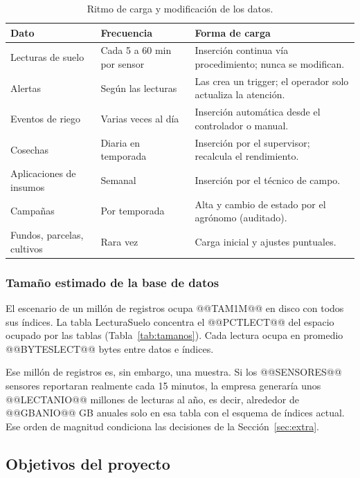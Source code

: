 \documentclass[11pt,letterpaper]{article}
\newcommand{\tbus}{\textunderscore\allowbreak}
\newcommand{\tb}[1]{{\ttfamily\let\_\tbus #1}}
\begin{document}
\begin{table}[H]
\centering\small
\begin{tabularx}{\textwidth}{>{\raggedright\arraybackslash}p{3.3cm}>{\raggedright\arraybackslash}p{3.2cm}X}
\toprule
\textbf{Dato} & \textbf{Frecuencia} & \textbf{Forma de carga} \\
\midrule
Lecturas de suelo & Cada 5 a 60 min por sensor & Inserción continua vía procedimiento; nunca se modifican. \\
Alertas & Según las lecturas & Las crea un trigger; el operador solo actualiza la atención. \\
Eventos de riego & Varias veces al día & Inserción automática desde el controlador o manual. \\
Cosechas & Diaria en temporada & Inserción por el supervisor; recalcula el rendimiento. \\
Aplicaciones de insumos & Semanal & Inserción por el técnico de campo. \\
Campañas & Por temporada & Alta y cambio de estado por el agrónomo (auditado). \\
Fundos, parcelas, cultivos & Rara vez & Carga inicial y ajustes puntuales. \\
\bottomrule
\end{tabularx}
\caption{Ritmo de carga y modificación de los datos.}
\label{tab:ritmos}
\end{table}

\subsubsection{Tamaño estimado de la base de datos}

El escenario de un millón de registros ocupa @@TAM1M@@ en disco con todos sus índices. La tabla \tb{Lectura\_Suelo} concentra el @@PCTLECT@@ del espacio ocupado por las tablas (Tabla~\ref{tab:tamanos}). Cada lectura ocupa en promedio @@BYTESLECT@@ bytes entre datos e índices.


Ese millón de registros es, sin embargo, una muestra. Si los @@SENSORES@@ sensores reportaran realmente cada 15 minutos, la empresa generaría unos @@LECTANIO@@ millones de lecturas al año, es decir, alrededor de @@GBANIO@@ GB anuales solo en esa tabla con el esquema de índices actual. Ese orden de magnitud condiciona las decisiones de la Sección~\ref{sec:extra}.

\subsection{Objetivos del proyecto}
\end{document}
